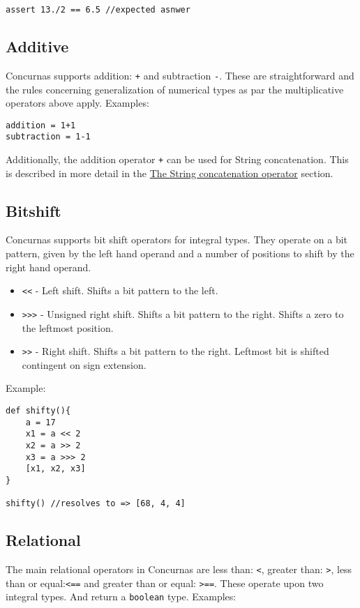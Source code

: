 \documentclass[conc-doc]{subfiles}
\begin{document}
\begin{lstlisting}
assert 13./2 == 6.5 //expected asnwer
\end{lstlisting}

\subsection{Additive}
Concurnas supports addition: \lstinline{+} and subtraction \lstinline{-}. These are straightforward and the rules concerning generalization of numerical types as par the multiplicative operators above apply. Examples:

\begin{lstlisting}
addition = 1+1
subtraction = 1-1
\end{lstlisting}

Additionally, the addition operator \lstinline{+} can be used for String concatenation. This is described in more detail in the \hyperref[subsec:StringConcat]{The String concatenation operator} section.

\subsection{Bitshift}
Concurnas supports bit shift operators for integral types. They operate on a bit pattern, given by the left hand operand and a number of positions to shift by the right hand operand.

\begin{itemize}
	\item \lstinline{<<} - Left shift. Shifts a bit pattern to the left.
	\item \lstinline{>>>} - Unsigned right shift. Shifts a bit pattern to the right. Shifts a zero to the leftmost position.
	\item \lstinline{>>} - Right shift. Shifts a bit pattern to the right. Leftmost bit is shifted contingent on sign extension.
\end{itemize}

Example:
\begin{lstlisting}
def shifty(){
	a = 17
	x1 = a << 2
	x2 = a >> 2
	x3 = a >>> 2
	[x1, x2, x3]
}

shifty() //resolves to => [68, 4, 4]
\end{lstlisting}

\subsection{Relational}
The main relational operators in Concurnas are less than: \lstinline{<}, greater than: \lstinline{>}, less than or equal:\lstinline{<==} and greater than or equal: \lstinline{>==}. These operate upon two integral types. And return a \lstinline{boolean} type. Examples:
\end{document}
